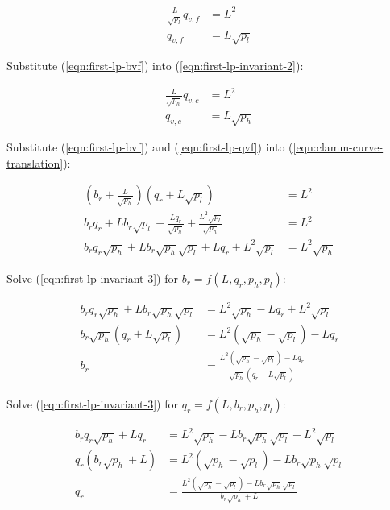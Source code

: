 \documentclass[table, twocolumn]{article}
\begin{document}
\begin{align} \label{eqn:first-lp-qvf}
  \frac{L}{\sqrt{p_l}} q_{v, f} & = L^2 \nonumber \\
  q_{v, f}                      & = L \sqrt{p_l}
\end{align}

Substitute (\ref{eqn:first-lp-bvf}) into (\ref{eqn:first-lp-invariant-2}):

\begin{align}
  \frac{L}{\sqrt{p_h}} q_{v, c} & = L^2 \nonumber \\
  q_{v, c}                      & = L \sqrt{p_h}
\end{align}

Substitute (\ref{eqn:first-lp-bvf}) and (\ref{eqn:first-lp-qvf}) into
(\ref{eqn:clamm-curve-translation}):

\begin{align} \label{eqn:first-lp-invariant-3}
  (b_r + \frac{L}{\sqrt{p_h}})(q_r + L \sqrt{p_l})
   & = L^2 \nonumber  \\
  b_r q_r + L b_r \sqrt{p_l} + \frac{L q_r}{\sqrt{p_h}} +
  \frac{L^2 \sqrt{p_l}}{\sqrt{p_h}}
   & = L^2 \nonumber  \\
  b_r q_r \sqrt{p_h} + L b_r \sqrt{p_h} \sqrt{p_l} + L q_r + L^2 \sqrt{p_l}
   & = L^2 \sqrt{p_h}
\end{align}

Solve (\ref{eqn:first-lp-invariant-3}) for $b_r = f(L, q_r, p_h, p_l)$:

\begin{align} \label{eqn:first-lp-br-from-l-qr}
  b_r q_r \sqrt{p_h} + L b_r \sqrt{p_h} \sqrt{p_l} & =
  L^2 \sqrt{p_h} - L q_r + L^2 \sqrt{p_l} \nonumber    \\
  b_r \sqrt{p_h} (q_r + L \sqrt{p_l})              & =
  L^2 (\sqrt{p_h} - \sqrt{p_l}) - L q_r \nonumber      \\
  b_r                                              & =
  \frac{L^2 (\sqrt{p_h} - \sqrt{p_l}) - L q_r}{\sqrt{p_h}(q_r + L \sqrt{p_l})}
\end{align}

Solve (\ref{eqn:first-lp-invariant-3}) for $q_r = f(L, b_r, p_h, p_l)$:

\begin{align} \label{eqn:first-lp-qr-from-l-br}
  b_r q_r \sqrt{p_h} + L q_r & =
  L^2 \sqrt{p_h} - L b_r \sqrt{p_h} \sqrt{p_l} - L^2 \sqrt{p_l} \nonumber \\
  q_r (b_r \sqrt{p_h} + L)   & =
  L^2 (\sqrt{p_h} - \sqrt{p_l}) - L b_r \sqrt{p_h} \sqrt{p_l} \nonumber   \\
  q_r                        & =
  \frac{L^2 (\sqrt{p_h} - \sqrt{p_l}) - L b_r \sqrt{p_h} \sqrt{p_l}}
  {b_r \sqrt{p_h} + L}
\end{align}
\end{document}
